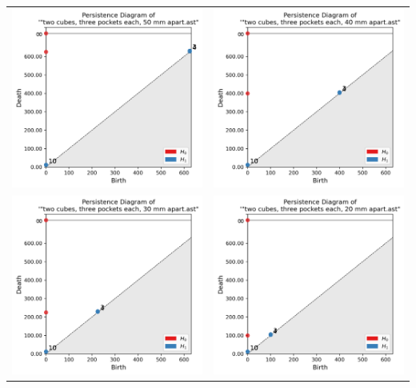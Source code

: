 \documentclass[ma]{uncgdissertationexp}
\theoremstyle{plain}
\theoremstyle{definition}
\theoremstyle{remark}
\begin{document}
\begin{table}[H]
\begin{center}
    \begin{tabular}{cc}
         \includegraphics[width=2.5in]{Final Run, (two cubes, three pockets each, 50 mm apart) persdia.png} &
         \includegraphics[width=2.5in]{Final Run, (two cubes, three pockets each, 40 mm apart) persdia.png} \\ 
         \includegraphics[width=2.5in]{Final Run, (two cubes, three pockets each, 30 mm apart) persdia.png} &
         \includegraphics[width=2.5in]{Final Run, (two cubes, three pockets each, 20 mm apart) persdia.png} \\ 

\end{tabular}
\end{center}
\end{table}
\end{document}

